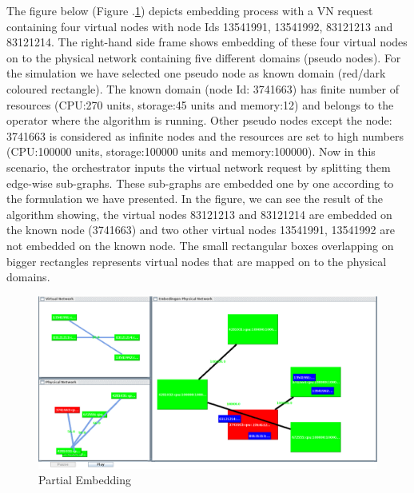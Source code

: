 \documentclass[article,dr=phil,type=msc ,colorback,accentcolor=tud4b]{tudthesis}
\begin{document}
The figure below (Figure .\ref{Partial_embedding}) depicts embedding process with a VN request containing four virtual nodes with node Ids 13541991, 13541992, 83121213 and 83121214. The right-hand side frame shows embedding of these four virtual nodes on to the physical network containing five different domains (pseudo nodes). For the simulation we have selected one pseudo node as known domain (red/dark coloured rectangle). The known domain (node Id: 3741663) has finite number of resources (CPU:270 units, storage:45 units and memory:12) and belongs to the operator where the algorithm is running. Other pseudo nodes except the node: 3741663 is considered as infinite nodes and the resources are set to high numbers (CPU:100000 units, storage:100000 units and memory:100000). Now in this scenario, the orchestrator inputs the virtual network request by splitting them edge-wise sub-graphs. These sub-graphs are embedded one by one according to the formulation we have presented. In the figure, we can see the result of the algorithm showing, the virtual nodes 83121213 and 83121214 are embedded on the known node (3741663) and two other virtual nodes 13541991, 13541992 are not embedded on the known node. The small rectangular boxes overlapping on bigger rectangles represents virtual nodes that are mapped on to the physical domains.

\begin{figure}[h]
	\centering
	\includegraphics[width=\linewidth]{embedding.png}
	\caption{Partial Embedding}
	\label{Partial_embedding}
\end{figure}
\end{document}
